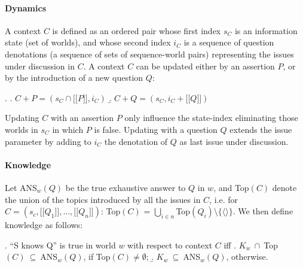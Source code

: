 \documentclass[a4paper, 11pt]{article}
\newcommand{\lin}{\ensuremath{\lbrack\!\lbrack}}
\newcommand{\rin}{\ensuremath{\rbrack\!\rbrack}}
\begin{document}
\paragraph{Dynamics}


A context $C$ is defined as an ordered pair whose first index
$s_C$ is an information state (set of worlds), and whose second
index $i_C$ is a sequence of question denotations (a sequence of sets of   sequence-world pairs)  representing  the issues  under discussion in $C$. A context $C$ can be updated either by an assertion
$P$, or by the introduction of a new question $Q$:

\ex. \a. $C+P = (s_C \cap \lin P\rin, i_C)$
\b. $C+Q= (s_C, i_C+\lin Q\rin)$

Updating $C$ with an assertion $P$ only influence the state-index    eliminating those worlds in $s_C$ in which $P$ is false.  Updating with a question $Q$ extends the issue parameter by adding to $i_C$ the denotation of $Q$ as last issue under discussion.
 
\paragraph{Knowledge} Let ANS$_w(Q)$ be the true exhaustive answer to $Q$ in $w$, and Top$(C)$ denote the union of the topics introduced by  all  the issues in $C$, i.e.  for $C= (s_c,\lin Q_1 \rin, ..., \lin Q_n \rin)$:
Top$(C)$ = $\bigcup_{i\in n} $Top$(Q_i) \setminus \{\langle \rangle\}$.
We then define knowledge as follows:

\ex. ``S knows Q'' is true in world $w$ with respect to context $C$ iff \a. $K_w \ \cap\ $Top$(C) \ \subseteq \ $ANS$_w(Q)$, if  Top$(C)\neq\emptyset$; \b. $K_w   \ \subseteq \ $ANS$_w(Q)$, otherwise.


  


 
\end{document}

